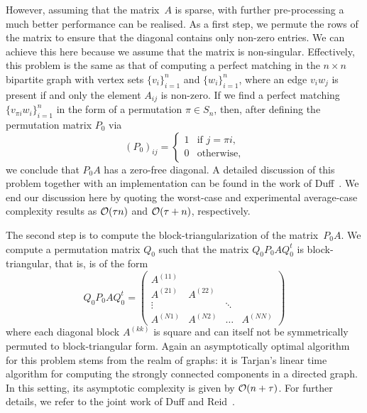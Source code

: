 However, assuming that the matrix~$A$ is sparse, with further pre-processing 
a much better performance can be realised.  As a first step, we permute the 
rows of the matrix to ensure that the diagonal contains only non-zero entries.  
We can achieve this here because we assume that the matrix is non-singular.  
Effectively, this problem is the same as that of computing a perfect matching 
in the $n \times n$ bipartite graph with vertex sets $\{v_i\}_{i=1}^n$ and 
$\{w_i\}_{i=1}^n$, where an edge $v_i w_j$ is present if and only the element 
$A_{ij}$ is non-zero.  If we find a perfect matching 
$\{v_{\pi i} w_i\}_{i=1}^n$ in the form of a permutation $\pi \in S_n$, then, 
after defining the permutation matrix $P_0$ via 
\begin{equation}
(P_0)_{ij} = \begin{cases} 1 & \text{if $j = \pi i$}, \\
                           0 & \text{otherwise,} \end{cases}
\end{equation}
we conclude that $P_0 A$ has a zero-free diagonal.  A detailed discussion of 
this problem together with an implementation can be found in the work of 
Duff~\citep{Duf81a,Duf81b}.  We end our discussion here by quoting the 
worst-case and experimental average-case complexity results as $\mathcal{O}(\tau n)$ 
and $\mathcal{O}(\tau + n)$, respectively.

The second step is to compute the block-triangularization of the 
matrix~$P_0 A$.  We compute a permutation matrix $Q_0$ such that the matrix 
$Q_0 P_0 A Q_0^t$ is block-triangular, that is, is of the form
\begin{equation}
Q_0 P_0 A Q_0^t = \begin{pmatrix}
                  A^{(11)} &                   &          \\
                  A^{(21)} & A^{(22)} &        &          \\
                  \vdots   &          & \ddots &          \\
                  A^{(N1)} & A^{(N2)} & \hdots & A^{(NN)}
                  \end{pmatrix}
\end{equation}
where each diagonal block $A^{(kk)}$ is square and can itself not be 
symmetrically permuted to block-triangular form.  Again an asymptotically 
optimal algorithm for this problem stems from the realm of graphs:  it is 
Tarjan's linear time algorithm for computing the strongly connected 
components in a directed graph.  In this setting, its asymptotic complexity 
is given by $\mathcal{O}(n + \tau)$.  For further details, we refer to the joint 
work of Duff and Reid~\citep{Duf78a,Duf78b}.

